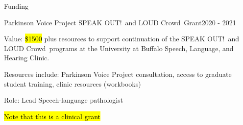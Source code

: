 \documentclass{resume} %
\begin{document}
\begin{rSection}{Funding}

%




%


\begin{rSubsection}{Parkinson Voice Project SPEAK OUT!\textregistered \ and LOUD Crowd\textregistered \ Grant}{2020 - 2021}{}{}
	\item Value: \hl{\$1500} plus resources to support continuation of the SPEAK OUT!\textregistered \ and LOUD Crowd\textregistered \ programs at the University at Buffalo Speech, Language, and Hearing Clinic.
	\item Resources include: Parkinson Voice Project consultation, access to graduate student training, clinic resources (workbooks)
	\item Role: Lead Speech-language pathologist
	\item \hl{Note that this is a clinical grant}
\end{rSubsection}


\end{rSection}
\end{document}
